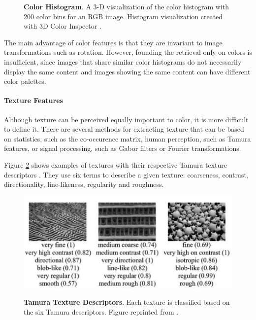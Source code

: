 \documentclass[12pt]{report}
\begin{document}
\begin{figure}[h]
\centering
{}
\caption{\label{fig:color_hist} \textbf{Color Histogram}. A 3-D visualization of the color histogram with 200 color bins for an RGB image. Histogram visualization created with 3D Color Inspector \cite{barthel_3d_nodate}.}
\end{figure}

The main advantage of color features is that they are invariant to image transformations such as rotation. However, founding the retrieval only on colors is insufficient, since images that share similar color histograms do not necessarily display the same content and images showing the same content can have different color palettes.

\paragraph{Texture Features}
Although texture can be perceived equally important to color, it is more difficult to define it. There are several methods for extracting texture that can be based on statistics, such as the co-occurence matrix, human perception, such as Tamura features, or signal processing, such as Gabor filters or Fourier transformations.

Figure \ref{fig:texture_feat} shows examples of textures with their respective Tamura texture descriptors \cite{tamura1978textural}. They use six terms to describe a given texture: coarseness, contrast, directionality, line-likeness, regularity and roughness. 

\begin{figure}[h]
\centering
{\includegraphics[width=0.7\linewidth]{02_background/CBIR/texture_features}}
\caption{\label{fig:texture_feat} \textbf{Tamura Texture Descriptors}. Each texture is classified based on the six Tamura descriptors. Figure reprinted from \cite{LIN20032255}.}
\end{figure}
\end{document}
